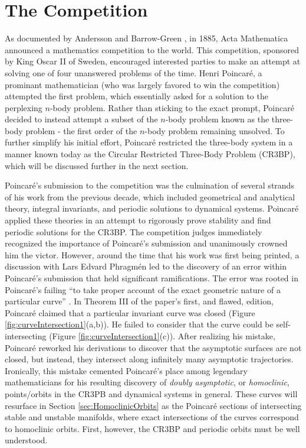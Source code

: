 \documentclass[11pt]{article} %
\begin{document}
\section{The Competition}
As documented by Andersson and Barrow-Green \cite{Andersson1994,BarrowGreen1994}, in 1885, Acta Mathematica announced a mathematics competition to the world. This competition, sponsored by King Oscar II of Sweden, encouraged interested parties to make an attempt at solving one of four unanswered problems of the time. Henri Poincaré, a prominant mathematician (who was largely favored to win the competition) attempted the first problem, which essentially asked for a solution to the perplexing $n$-body problem. Rather than sticking to the exact prompt, Poincaré decided to instead attempt a subset of the $n$-body problem known as the three-body problem - the first order of the $n$-body problem remaining unsolved. To further simplify his initial effort, Poincaré restricted the three-body system in a manner known today as the Circular Restricted Three-Body Problem (CR3BP), which will be discussed further in the next section.

Poincaré's submission to the competition was the culmination of several strands of his work from the previous decade, which included geometrical and analytical theory, integral invariants, and periodic solutions to dynamical systems. Poincaré applied these theories in an attempt to rigorously prove stability and find periodic solutions for the CR3BP. The competition judges immediately recognized the importance of Poincaré's submission and unanimously crowned him the victor. However, around the time that his work was first being printed, a discussion with Lars Edvard Phragmén led to the discovery of an error within Poincaré's submission that held significant ramifications. The error was rooted in Poincaré's failing ``to take proper account of the exact geometric nature of a particular curve'' \cite{BarrowGreen1997}. In Theorem III of the paper's first, and flawed, edition, Poincaré claimed that a particular invariant curve was closed (Figure \ref{fig:curveIntersection1}(a,b)). He failed to consider that the curve could be self-intersecting (Figure \ref{fig:curveIntersection1}(c)). After realizing his mistake, Poincaré reworked his derivations to discover that the asymptotic surfaces are not closed, but instead, they intersect along infinitely many asymptotic trajectories. Ironically, this mistake cemented Poincaré's place among legendary mathematicians for his resulting discovery of \textit{doubly asymptotic}, or \textit{homoclinic}, points/orbits in the CR3PB and dynamical systems in general. These curves will resurface in Section \ref{sec:HomoclinicOrbits} as the Poincaré sections of intersecting stable and unstable manifolds, where exact intersections of the curves correspond to homoclinic orbits. First, however, the CR3BP and periodic orbits must be well understood.
\end{document}
